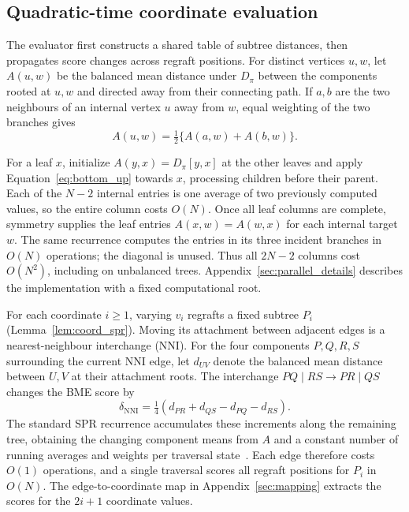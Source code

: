 \begin{samepage}
\subsection{Quadratic-time coordinate evaluation}

The evaluator first constructs a shared table of subtree distances, then propagates score changes across regraft positions.
For distinct vertices $u,w$, let $A(u,w)$ be the balanced mean distance under $D_\pi$ between the components rooted at $u,w$ and directed away from their connecting path.
If $a,b$ are the two neighbours of an internal vertex $u$ away from $w$, equal weighting of the two branches gives
\begin{equation}
 A(u,w)=\tfrac12\{A(a,w)+A(b,w)\}.
 \label{eq:bottom_up}
\end{equation}
\end{samepage}

For a leaf $x$, initialize $A(y,x)=D_\pi[y,x]$ at the other leaves and apply Equation~\eqref{eq:bottom_up} towards $x$, processing children before their parent.
Each of the $N-2$ internal entries is one average of two previously computed values, so the entire column costs $O(N)$.
Once all leaf columns are complete, symmetry supplies the leaf entries $A(x,w)=A(w,x)$ for each internal target $w$.
The same recurrence computes the entries in its three incident branches in $O(N)$ operations; the diagonal is unused.
Thus all $2N-2$ columns cost $O(N^2)$, including on unbalanced trees.
Appendix~\ref{sec:parallel_details} describes the implementation with a fixed computational root.

For each coordinate $i\geq1$, varying $v_i$ regrafts a fixed subtree $P_i$ (Lemma~\ref{lem:coord_spr}).
Moving its attachment between adjacent edges is a nearest-neighbour interchange (NNI).
For the four components $P,Q,R,S$ surrounding the current NNI edge, let $d_{UV}$ denote the balanced mean distance between $U,V$ at their attachment roots.
The interchange $PQ\mid RS\to PR\mid QS$ changes the BME score by
\begin{equation}
 \delta_{\mathrm{NNI}}=\tfrac14(d_{PR}+d_{QS}-d_{PQ}-d_{RS}).
 \label{eq:nni_increment}
\end{equation}
The standard SPR recurrence accumulates these increments along the remaining tree, obtaining the changing component means from $A$ and a constant number of running averages and weights per traversal state~\cite{hordijk2005spr}.
Each edge therefore costs $O(1)$ operations, and a single traversal scores all regraft positions for $P_i$ in $O(N)$.
The edge-to-coordinate map in Appendix~\ref{sec:mapping} extracts the scores for the $2i+1$ coordinate values.

